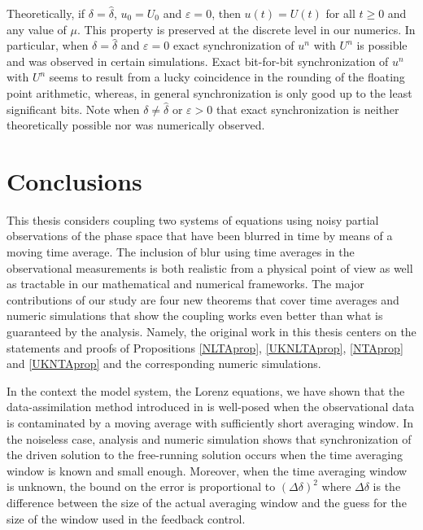 \documentclass[master,tocprelim,12pt]{unrthesis}
\theoremstyle{definition}
\numberwithin{equation}{chapter}
\begin{document}
\begin{manuscript}
Theoretically, if $\delta=\hat\delta$, $u_0=U_0$ and $\varepsilon=0$, 
then $u(t)=U(t)$ for all $t\ge 0$ and any value of $\mu$.  
This property is preserved at the discrete level in our numerics.
In particular, when $\delta=\hat\delta$ and $\varepsilon=0$
exact synchronization of $u^n$ with $U^n$ is possible and was 
observed in certain simulations.
Exact bit-for-bit synchronization of $u^n$ with $U^n$ seems to
result from a lucky coincidence in the rounding of the floating 
point arithmetic, whereas, in general synchronization is
only good up to the least significant bits.
Note when $\delta\ne\hat\delta$ or $\varepsilon>0$ that
exact synchronization is neither theoretically possible nor 
was numerically observed.

\chapter{Conclusions}

This thesis considers coupling two systems of equations using
noisy partial observations of the phase space that have been
blurred in time by means of a moving time average.
The inclusion of blur using time averages in the observational 
measurements is both realistic from a physical point of view
as well as tractable in our mathematical and numerical frameworks.
The major contributions of our study are four new theorems 
that cover time averages and numeric simulations that show
the coupling works even better than what is guaranteed by
the analysis.  Namely, the original work in this thesis
centers on the statements and proofs of Propositions \ref{NLTAprop},
\ref{UKNLTAprop}, \ref{NTAprop} and \ref{UKNTAprop} and the
corresponding numeric simulations.

In the context the model system, the Lorenz equations, we have shown that the 
data-assimilation method introduced in \cite{Olson14} is well-posed
when the observational data is contaminated by a moving average
with sufficiently short averaging window. In the noiseless case,
analysis and numeric simulation shows that synchronization
of the driven solution to the free-running solution occurs when
the time averaging window is known and small enough.
Moreover, when the time averaging window is unknown, the bound on 
the error is proportional to $(\Delta\delta)^2$ where $\Delta\delta$ 
is the difference between the size of the actual averaging window 
and the guess for the size of the window used in the feedback
control.


\end{manuscript}
\end{document}

